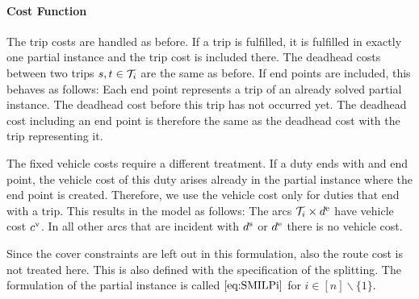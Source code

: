 \paragraph{Cost Function} \parfill

The trip costs are handled as before. If a trip is fulfilled, it is fulfilled in exactly one partial instance and the trip cost is included there. The deadhead costs between two trips $s,t\in\mathcal{T}_i$ are the same as before. If end points are included, this behaves as follows: Each end point represents a trip of an already solved partial instance. The deadhead cost before this trip has not occurred yet. The deadhead cost including an end point is therefore the same as the deadhead cost with the trip representing it.

The fixed vehicle costs require a different treatment. If a duty ends with and end point, the vehicle cost of this duty arises already in the partial instance where the end point is created. Therefore, we use the vehicle cost only for duties that end with a trip. This results in the model as follows: The arcs ${\mathcal{T}_i\times d^{\operatorname{e}}}$ have vehicle cost $c^{\operatorname{v}}$. In all other arcs that are incident with $d^{\operatorname{s}}$ or $d^{\operatorname{e}}$ there is no vehicle cost.

Since the cover constraints are left out in this formulation, also the route cost is not treated here. This is also defined with the specification of the splitting. The formulation of the partial instance is called $\eqref{eq:SMILPi}$ for ${i\in[n]\backslash\{1\}}$.

